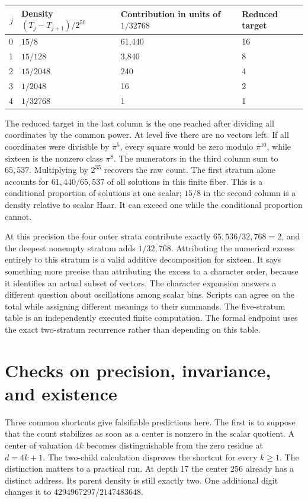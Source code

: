 \documentclass[12pt,letterpaper]{article}
\begin{document}
\begin{center}\small\begin{tabular}{rlll}\toprule
$j$&Density $(T_j-T_{j+1})/2^{50}$&Contribution in units of $1/32768$&Reduced target\\\midrule
0&$15/8$&61,440&16\\
1&$15/128$&3,840&8\\
2&$15/2048$&240&4\\
3&$1/2048$&16&2\\
4&$1/32768$&1&1\\\bottomrule
\end{tabular}\end{center}
The reduced target in the last column is the one reached after dividing all coordinates by the common power. At level five there are no vectors left. If all coordinates were divisible by $\pi^5$, every square would be zero modulo $\pi^{10}$, while sixteen is the nonzero class $\pi^8$. The numerators in the third column sum to $65{,}537$. Multiplying by $2^{35}$ recovers the raw count. The first stratum alone accounts for $61{,}440/65{,}537$ of all solutions in this finite fiber. This is a conditional proportion of solutions at one scalar; $15/8$ in the second column is a density relative to scalar Haar. It can exceed one while the conditional proportion cannot.

At this precision the four outer strata contribute exactly $65{,}536/32{,}768=2$, and the deepest nonempty stratum adds $1/32{,}768$. Attributing the numerical excess entirely to this stratum is a valid additive decomposition for sixteen. It says something more precise than attributing the excess to a character order, because it identifies an actual subset of vectors. The character expansion answers a different question about oscillations among scalar bins. Scripts can agree on the total while assigning different meanings to their summands. The five-stratum table is an independently executed finite computation. The formal endpoint uses the exact two-stratum recurrence rather than depending on this table.

\section{Checks on precision, invariance, and existence}
Three common shortcuts give falsifiable predictions here. The first is to suppose that the count stabilizes as soon as a center is nonzero in the scalar quotient. A center of valuation $4k$ becomes distinguishable from the zero residue at $d=4k+1$. The two-child calculation disproves the shortcut for every $k\ge1$. The distinction matters to a practical run. At depth 17 the center 256 already has a distinct address. Its parent density is still exactly two. One additional digit changes it to $4294967297/2147483648$.
\end{document}
